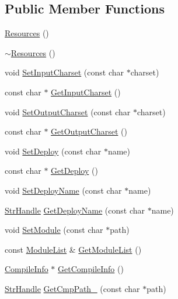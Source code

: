 \subsection*{Public Member Functions}
\begin{DoxyCompactItemize}
\item 
\hyperlink{classmocha_1_1_resources_a28172a822f20ce86dd3518ce7aa23696}{Resources} ()
\item 
\hyperlink{classmocha_1_1_resources_acfb5b10f8905f07dc142c2ed37fa2f6b}{$\sim$Resources} ()
\item 
void \hyperlink{classmocha_1_1_resources_a0a1820141af94df72a1bea554d58c000}{SetInputCharset} (const char $\ast$charset)
\item 
const char $\ast$ \hyperlink{classmocha_1_1_resources_a1192a54c134669fc945d5375c269f546}{GetInputCharset} ()
\item 
void \hyperlink{classmocha_1_1_resources_a6b8ac163157c15154a949cf3b5fa160c}{SetOutputCharset} (const char $\ast$charset)
\item 
const char $\ast$ \hyperlink{classmocha_1_1_resources_a7d73ba519e11a29e9f8d49836f480a40}{GetOutputCharset} ()
\item 
void \hyperlink{classmocha_1_1_resources_a471dce4e662592587a7b1ef62a976f0a}{SetDeploy} (const char $\ast$name)
\item 
const char $\ast$ \hyperlink{classmocha_1_1_resources_aa026b50d4826873543f414c64673a0e3}{GetDeploy} ()
\item 
void \hyperlink{classmocha_1_1_resources_a9f33386aa0393b16e4c8c3efd2f8d05a}{SetDeployName} (const char $\ast$name)
\item 
\hyperlink{classmocha_1_1_array_handle}{StrHandle} \hyperlink{classmocha_1_1_resources_a9af9e30463db500fc06bb54a4b7e8a5a}{GetDeployName} (const char $\ast$name)
\item 
void \hyperlink{classmocha_1_1_resources_afcb3df1202f2a8040f7e12a9870ad073}{SetModule} (const char $\ast$path)
\item 
const \hyperlink{classmocha_1_1_resources_aad639c8977988cfb76e0f7bd52a01f12}{ModuleList} \& \hyperlink{classmocha_1_1_resources_a03315978b80b9f60702b1127f4afd276}{GetModuleList} ()
\item 
\hyperlink{classmocha_1_1_compile_info}{CompileInfo} $\ast$ \hyperlink{classmocha_1_1_resources_a1683c12f23021ae19de9f0039ecc1355}{GetCompileInfo} ()
\item 
\hyperlink{classmocha_1_1_array_handle}{StrHandle} \hyperlink{classmocha_1_1_resources_a7c444023b65bb89be6937f75773412a0}{GetCmpPath\_\-} (const char $\ast$path)
\end{DoxyCompactItemize}
